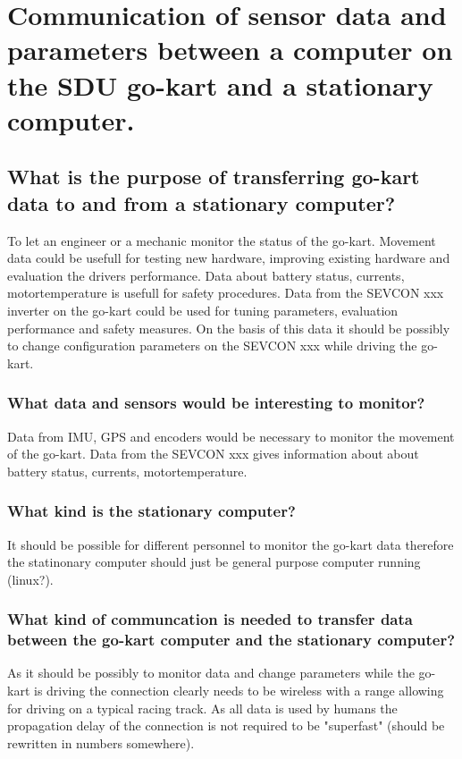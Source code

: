 
\section{Communication of sensor data and parameters between a computer on the SDU go-kart and a stationary computer.}
\subsection{What is the purpose of transferring go-kart data to and from a stationary computer?}
To let an engineer or a mechanic monitor the status of the go-kart.
Movement data could be usefull for testing new hardware, improving existing hardware and evaluation the drivers performance. 
Data about battery status, currents, motortemperature is usefull for safety procedures.
Data from the SEVCON xxx inverter on the go-kart could be used for tuning parameters, evaluation performance and safety measures.
On the basis of this data it should be possibly to change configuration parameters on the SEVCON xxx while driving the go-kart.

\subsubsection*{What data and sensors would be interesting to monitor?}
Data from IMU, GPS and encoders would be necessary to monitor the movement of the go-kart.
Data from the SEVCON xxx gives information about about battery status, currents, motortemperature.

\subsubsection*{What kind is the stationary computer?}
It should be possible for different personnel to monitor the go-kart data therefore the statinonary computer should just be general purpose computer running (linux?).

\subsubsection*{What kind of communcation is needed to transfer data between the go-kart computer and the stationary computer?}
As it should be possibly to monitor data and change parameters while the go-kart is driving the connection clearly needs to be wireless with a range allowing for driving on a typical racing track. 
As all data is used by humans the propagation delay of the connection is not required to be "superfast" (should be rewritten in numbers somewhere).


